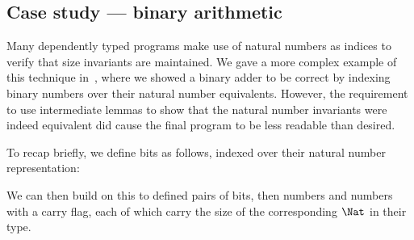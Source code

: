 
\subsection{Case study --- binary arithmetic}

\label{sec:binary}

Many dependently typed programs make use of natural numbers as indices
to verify that size invariants are maintained. We gave a more complex example
of this technique in~\cite{tfp-ccc}, where we showed a binary adder to
be correct by indexing binary numbers over their natural number
equivalents. However, the requirement to use intermediate lemmas to
show that the natural number invariants were indeed equivalent did
cause the final program to be less readable than desired.

To recap briefly, we define bits as follows, indexed over their
natural number representation:

\DM{\AR{
\Data\hg\:\Bit\:\Hab\:\AR{\Nat\to\Type\hg\Where}\:
\bO\:\Hab\:\AR{\Bit\:\Z}\:\mid \bI\:\Hab\:\AR{\Bit\:(\suc\:\Z)}
}}

We can then build on this to defined pairs of bits, then
numbers and numbers with a carry flag, each of which carry the size of
the corresponding $\Nat$ in their type.


